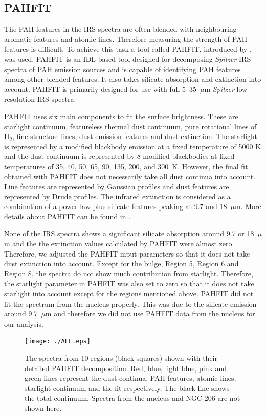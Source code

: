 \subsection{PAHFIT}

The PAH features in the IRS spectra are often blended with neighbouring aromatic features and atomic lines. Therefore measuring the strength of PAH features is difficult. To achieve this task a tool called PAHFIT, introduced by \citet{Smith:2007lr}, was used. PAHFIT is an IDL  based tool designed for decomposing {\em Spitzer} IRS spectra of PAH emission sources and is capable of identifying PAH features among other blended features. It also takes silicate absorption and extinction into account. PAHFIT is primarily designed for use with full 5--35~$\mu$m {\em Spitzer} low-resolution IRS spectra.

PAHFIT uses six main components to fit the surface brightness. These are starlight continuum, featureless thermal dust continuum, pure rotational lines of H$_2$, fine-structure lines, dust emission features and dust extinction. The starlight is represented by a modified blackbody emission at a fixed temperature of 5000 K and the dust continuum is represented by 8 modified blackbodies at fixed temperatures of 35, 40, 50, 65, 90, 135, 200, and 300~K. However, the final fit obtained with PAHFIT does not necessarily take all dust continua into account. Line features are represented by Gaussian profiles and dust features are represented by Drude profiles. The infrared extinction is considered as a combination of a power law plus silicate features peaking at 9.7 and 18~$\mu$m. More details about PAHFIT can be found in \citet{Smith:2007lr}.

None of the IRS spectra shows a significant silicate absorption around 9.7 or 18~$\mu$m and the the extinction values calculated by PAHFIT were almost zero. Therefore, we adjusted the PAHFIT input parameters so that it does not take dust extinction into account. Except for the bulge, Region 5, Region 6 and Region 8, the spectra do not show much contribution from starlight. Therefore, the starlight parameter in PAHFIT was also set to zero so that it does not take starlight into account except for the regions mentioned above. 
PAHFIT did not fit the spectrum from the nucleus properly. This was due to the silicate emission around 9.7~$\mu$m and therefore we did not use PAHFIT data from the nucleus for our analysis.


\begin{figure}
\centering
\texttt{[image: ./ALL.eps]}
  \caption{The spectra from 10 regions (black squares) shown with their detailed PAHFIT decomposition. Red, blue, light blue, pink and green lines represent the dust continua, PAH features, atomic lines, starlight continuum and the fit respectively. The black line shows the total continuum. Spectra from the nucleus and NGC 206 are not shown here.}
\label{PAHFITplots}
\end{figure}


